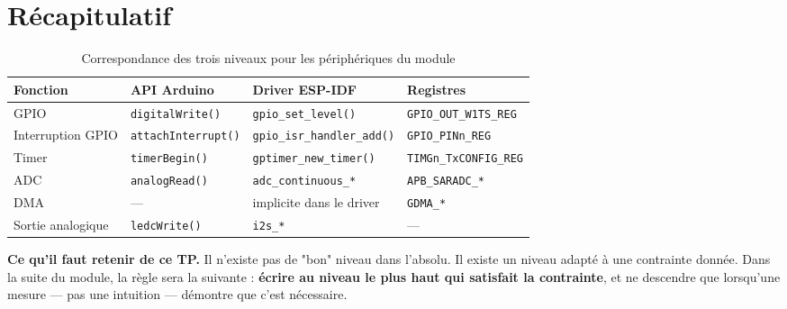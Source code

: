 \section{Récapitulatif}

\begin{table}[!h]
\centering
\renewcommand{\arraystretch}{1.3}
\begin{tabular}{|l|p{3.2cm}|p{3.7cm}|p{3.4cm}|}
\hline
\textbf{Fonction} & \textbf{API Arduino} & \textbf{Driver ESP-IDF} & \textbf{Registres} \\
\hline
GPIO & \texttt{digitalWrite()} & \texttt{gpio\_set\_level()} & \texttt{GPIO\_OUT\_W1TS\_REG} \\
\hline
Interruption GPIO & \texttt{attachInterrupt()} & \texttt{gpio\_isr\_handler\_add()} & \texttt{GPIO\_PINn\_REG} \\
\hline
Timer & \texttt{timerBegin()} & \texttt{gptimer\_new\_timer()} & \texttt{TIMGn\_TxCONFIG\_REG} \\
\hline
ADC & \texttt{analogRead()} & \texttt{adc\_continuous\_*} & \texttt{APB\_SARADC\_*} \\
\hline
DMA & --- & implicite dans le driver & \texttt{GDMA\_*} \\
\hline
Sortie analogique & \texttt{ledcWrite()} & \texttt{i2s\_*} & --- \\
\hline
\end{tabular}
\caption{Correspondance des trois niveaux pour les périphériques du module}
\end{table}

\begin{imp}
\textbf{Ce qu'il faut retenir de ce TP.} Il n'existe pas de "bon" niveau dans l'absolu. Il existe un niveau adapté à une contrainte donnée. Dans la suite du module, la règle sera la suivante : \textbf{écrire au niveau le plus haut qui satisfait la contrainte}, et ne descendre que lorsqu'une mesure — pas une intuition — démontre que c'est nécessaire.
\end{imp}